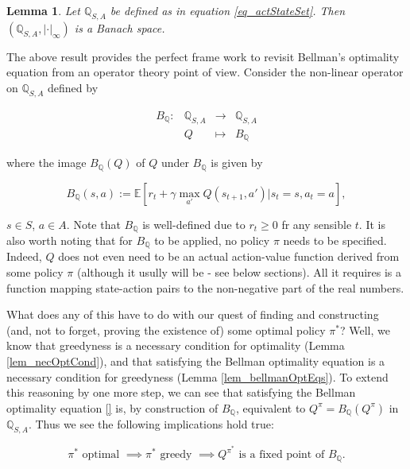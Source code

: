 \documentclass[11pt]{article} %
\newtheorem{lem}{Lemma}
\begin{document}
\begin{lem}\label{lem_compActStateVals}
	Let $\mathbb{Q}_{S,A}$ be defined as in equation \ref{eq_actStateSet}. Then $(\mathbb{Q}_{S,A},|\cdot|_{\infty})$ is a Banach space.
\end{lem}

The above result provides the perfect frame work to revisit Bellman's optimality equation from an operator theory point of view. Consider the non-linear operator on $\mathbb{Q}_{S,A}$ defined by

\begin{equation}
	\begin{array}{rrcl}
	B_{\mathbb{Q}}: 	& \mathbb{Q}_{S,A} 	& \rightarrow	& \mathbb{Q}_{S,A} \\
					& Q				& \mapsto 	& B_{\mathbb{Q}} 
	\end{array}
\end{equation}

where the image $B_{\mathbb{Q}}(Q)$ of $Q$ under $B_{\mathbb{Q}}$ is given by

\begin{equation}
	B_{\mathbb{Q}}(s,a) := \mathbb{E}[r_t + \gamma \max\limits_{a'} Q(s_{t+1},a') | s_t = s, a_t = a],
\end{equation}

$s \in S$, $a \in A$. Note that $B_{\mathbb{Q}}$ is well-defined due to $r_t \ge 0$ fr any sensible $t$. It is also worth noting that for $B_{\mathbb{Q}}$ to be applied, no policy $\pi$ needs to be specified. Indeed, $Q$ does not even need to be an actual action-value function derived from some policy $\pi$ (although it usully will be - see below sections). All it requires is a function mapping state-action pairs to the non-negative part of the real numbers.

What does any of this have to do with our quest of finding and constructing (and, not to forget, proving the existence of) some optimal policy $\pi^*$? Well, we know that greedyness is a necessary condition for optimality (Lemma \ref{lem_necOptCond}), and that satisfying the Bellman optimality equation is a necessary condition for greedyness (Lemma \ref{lem_bellmanOptEqs}). To extend this reasoning by one more step, we can see that satisfying the Bellman optimality equation \ref{} is, by construction of $B_{\mathbb{Q}}$, equivalent to $Q^{\pi} = B_{\mathbb{Q}}(Q^{\pi})$ in $\mathbb{Q}_{S,A}$. Thus we see the following implications hold true:

\begin{equation}\label{eq_optimalImps}
	\pi^* \text{ optimal } \implies \pi^* \text{ greedy } \implies Q^{\pi^*} \text{ is a fixed point of } B_{\mathbb{Q}}.
\end{equation}
\end{document}
